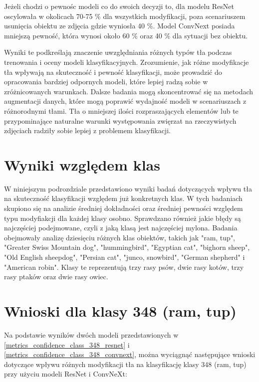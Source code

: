 Jeżeli chodzi o pewnośc modeli co do swoich decyzji to, dla modelu ResNet oscylowała w okolicach 70-75 \% dla wszystkich modyfikacji, poza scenariuszem usunięcia obiektu ze zdjęcia gdzie wyniosła 40 \%. Model ConvNext posiada mniejszą pewność, która wynosi około 60 \% oraz 40 \% dla 
sytuacji bez obiektu.

Wyniki te podkreślają znaczenie uwzględniania różnych typów tła podczas trenowania i oceny modeli klasyfikacyjnych. Zrozumienie, jak różne modyfikacje tła wpływają na skuteczność i pewność klasyfikacji, może prowadzić do opracowania bardziej odpornych modeli, które lepiej radzą 
sobie w zróżnicowanych warunkach. Dalsze badania mogą skoncentrować się na metodach augmentacji danych, które mogą poprawić wydajność modeli w scenariuszach z różnorodnymi tłami. Tła o mniejszej ilości rozpraszających elementów lub te przypominające naturalne warunki występowania zwięrzat
na rzeczywistych zdjęciach radziły sobie lepiej z problemem klasyfikacji. 

\section*{Wyniki względem klas}

W niniejszym podrozdziale przedstawiono wyniki badań dotyczących wpływu tła na skuteczność klasyfikacji względem już konkretnych klas. W tych badaniach skupiono się na analizie średniej dokładności oraz średniej pewności względem typu modyfiakcji dla każdej klasy osobno. Sprawdzano 
również jakie błędy są najczęściej podejmowane, czyli z jaką klasą jest najczęściej mylona. Badania obejmowały analizę dziesięciu różnych klas obiektów, takich jak "ram, tup", "Greater Swiss Mountain dog", "hummingbird", "Egyptian cat", "bighorn sheep", "Old English sheepdog", 
"Persian cat", "junco, snowbird", "German shepherd" i "American robin". Klasy te reprezentują trzy rasy psów, dwie rasy kotów, trzy rasy ptaków oraz dwie rasy owiec. 

\section*{Wnioski dla klasy 348 (ram, tup)}

Na podstawie wyników dwóch modeli przedstawionych w \ref*{metrics_confidence_class_348_resnet} i \ref*{metrics_confidence_class_348_convnext}, można wyciągnąć następujące wnioski dotyczące wpływu różnych 
modyfikacji tła na klasyfikację klasy 348 (ram, tup) przy użyciu modeli ResNet i ConvNeXt:


